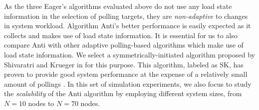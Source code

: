 \begin{table}[htbp]
\caption {Performance comparisons between the four LD algorithms.}
\label {tab:anti.basic.result_I.performance}

\begin{center}
\end{center}

\end{table}


\label{sec:anti.basic.result_II}

As the three Eager's algorithms evaluated above 
do not use any load state information in the selection of
polling targets, they are {\it non-adaptive\/} to changes in system workload.
Algorithm {\sc Anti}'s better performance is easily expected
as it collects and makes use of load state information.
%
It is essential for us to also compare {\sc Anti} with 
other adaptive polling-based algorithms which make use of 
load state information. 
We select a symmetrically-initiated algorithm proposed
by Shivaratri and Krueger in \cite{shiv90} for this purpose.
This algorithm, labeled as {\sc SK}, has proven to provide 
good system performance at the expense of a relatively small 
amount of pollings \cite{lu95b,shiv90}.
In this set of simulation experiments, 
we also focus to study the {\it scalability\/} of the {\sc Anti} algorithm
by employing different system sizes, from $N=10$ nodes to $N=70$ nodes.

